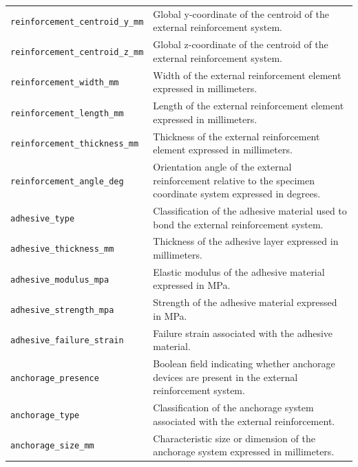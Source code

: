 \documentclass[11pt]{book}
\begin{document}
{\begin{longtable}{p{}p{}}
\texttt{reinforcement\_centroid\_y\_mm} &
Global y-coordinate of the centroid of the external reinforcement system. \\

\texttt{reinforcement\_centroid\_z\_mm} &
Global z-coordinate of the centroid of the external reinforcement system. \\

\texttt{reinforcement\_width\_mm} &
Width of the external reinforcement element expressed in millimeters. \\

\texttt{reinforcement\_length\_mm} &
Length of the external reinforcement element expressed in millimeters. \\

\texttt{reinforcement\_thickness\_mm} &
Thickness of the external reinforcement element expressed in millimeters. \\

\texttt{reinforcement\_angle\_deg} &
Orientation angle of the external reinforcement relative to the specimen coordinate system expressed in degrees. \\

\texttt{adhesive\_type} &
Classification of the adhesive material used to bond the external reinforcement system. \\

\texttt{adhesive\_thickness\_mm} &
Thickness of the adhesive layer expressed in millimeters. \\

\texttt{adhesive\_modulus\_mpa} &
Elastic modulus of the adhesive material expressed in MPa. \\

\texttt{adhesive\_strength\_mpa} &
Strength of the adhesive material expressed in MPa. \\

\texttt{adhesive\_failure\_strain} &
Failure strain associated with the adhesive material. \\

\texttt{anchorage\_presence} &
Boolean field indicating whether anchorage devices are present in the external reinforcement system. \\

\texttt{anchorage\_type} &
Classification of the anchorage system associated with the external reinforcement. \\

\texttt{anchorage\_size\_mm} &
Characteristic size or dimension of the anchorage system expressed in millimeters. \\


\end{longtable}}
\end{document}
